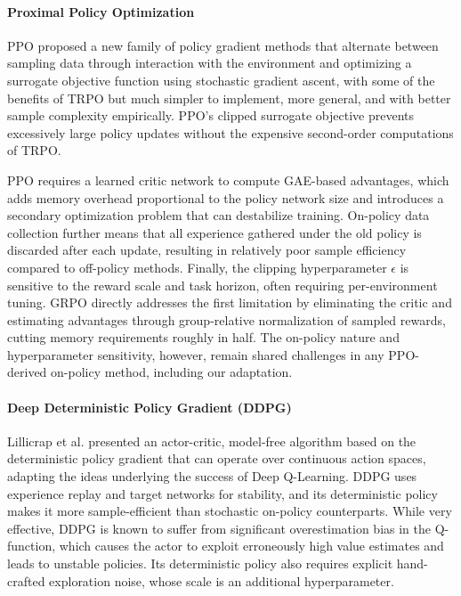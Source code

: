 \documentclass{article}
\begin{document}
\paragraph{Proximal Policy Optimization}
PPO proposed a new family of policy gradient methods that alternate between sampling data through interaction with the environment and optimizing a surrogate objective function using stochastic gradient ascent, with some of the benefits of TRPO \cite{schulman2015trust} but much simpler to implement, more general, and with better sample complexity empirically. PPO's clipped surrogate objective prevents excessively large policy updates without the expensive second-order computations of TRPO.

PPO requires a learned critic network to compute GAE-based advantages, which adds memory overhead proportional to
the policy network size and introduces a secondary optimization problem that can destabilize training.
On-policy data collection further means that all experience gathered under the old policy is discarded after each update, resulting in relatively poor sample efficiency compared to off-policy methods. Finally, the clipping hyperparameter $\epsilon$ is sensitive to the reward scale and task horizon, often requiring per-environment tuning. GRPO directly addresses the first limitation by eliminating the critic and estimating advantages through group-relative normalization of sampled rewards, cutting memory requirements roughly in half. The on-policy nature and hyperparameter sensitivity, however, remain shared challenges in any PPO-derived on-policy method, including our adaptation.

\paragraph{Deep Deterministic Policy Gradient (DDPG)}
Lillicrap et al. \cite{lillicrap2015continuous} presented an actor-critic, model-free algorithm based on the deterministic policy gradient that can operate over continuous action spaces, adapting the ideas underlying the success of Deep Q-Learning. DDPG uses experience replay and target networks for stability, and its deterministic policy makes it more sample-efficient than stochastic on-policy counterparts.
While very effective, DDPG is known to suffer from significant overestimation bias in the Q-function, which causes the actor to exploit erroneously high value estimates and leads to unstable policies. Its deterministic policy also requires explicit hand-crafted exploration noise, whose scale is an additional hyperparameter.
\end{document}
